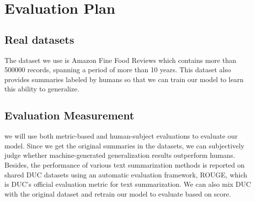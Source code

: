 \documentclass[conference]{IEEEtran}
\begin{document}
\section{Evaluation Plan}
\subsection{Real datasets}
The dataset we use is Amazon Fine Food Reviews which contains more than 500000 records, spanning a period of more than 10 years. This dataset also provides summaries labeled by humans so that we can train our model to learn this ability to generalize. 
\subsection{Evaluation Measurement}
we will use both metric-based and human-subject evaluations to evaluate our model. Since we get the original summaries in the datasets, we can subjectively judge whether machine-generated generalization results outperform humans.  Besides, the performance of various text summarization methods is reported on shared DUC datasets using an automatic evaluation framework, ROUGE, which is DUC’s official evaluation metric for text summarization. We can also mix DUC with the original dataset and retrain our model to evaluate based on score.


\end{document}
